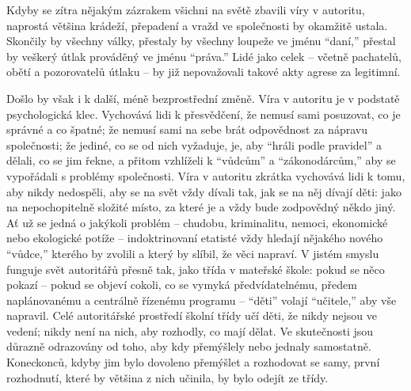 \documentclass{book}
\begin{document}
Kdyby se zítra nějakým zázrakem všichni na světě zbavili víry v autoritu, naprostá většina krádeží, přepadení a vražd ve společnosti by okamžitě ustala. Skončily by všechny války, přestaly by všechny loupeže ve jménu \enquote{daní,} přestal by veškerý útlak prováděný ve jménu \enquote{práva.} Lidé jako celek -- včetně pachatelů, obětí a pozorovatelů útlaku -- by již nepovažovali takové akty agrese za legitimní.

Došlo by však i k další, méně bezprostřední změně. Víra v autoritu je v podstatě psychologická klec. Vychovává lidi k přesvědčení, že nemusí sami posuzovat, co je správné a co špatné; že nemusí sami na sebe brát odpovědnost za nápravu společnosti; že jediné, co se od nich vyžaduje, je, aby \enquote{hráli podle pravidel} a dělali, co se jim řekne, a přitom vzhlíželi k \enquote{vůdcům} a \enquote{zákonodárcům,} aby se vypořádali s problémy společnosti. Víra v autoritu zkrátka vychovává lidi k tomu, aby nikdy nedospěli, aby se na svět vždy dívali tak, jak se na něj dívají děti: jako na nepochopitelně složité místo, za které je a vždy bude zodpovědný někdo jiný. Ať už se jedná o jakýkoli problém -- chudobu, kriminalitu, nemoci, ekonomické nebo ekologické potíže -- indoktrinovaní etatisté vždy hledají nějakého nového \enquote{vůdce,} kterého by zvolili a který by slíbil, že věci napraví. V jistém smyslu funguje svět autoritářů přesně tak, jako třída v mateřské škole: pokud se něco pokazí -- pokud se objeví cokoli, co se vymyká předvídatelnému, předem naplánovanému a centrálně řízenému programu -- \enquote{děti} volají \enquote{učitele,} aby vše napravil. Celé autoritářské prostředí školní třídy učí děti, že nikdy nejsou ve vedení; nikdy není na nich, aby rozhodly, co mají dělat. Ve skutečnosti jsou důrazně odrazovány od toho, aby kdy přemýšlely nebo jednaly samostatně. Koneckonců, kdyby jim bylo dovoleno přemýšlet a rozhodovat se samy, první rozhodnutí, které by většina z nich učinila, by bylo odejít ze třídy.
\end{document}
